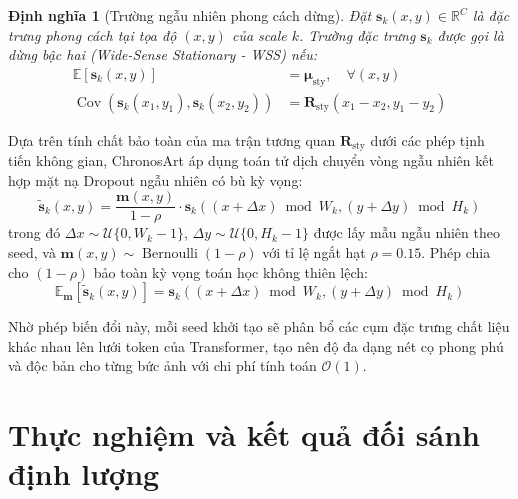 \documentclass[10pt,twocolumn,letterpaper]{article}
\newtheorem{definition}{Định nghĩa}
\begin{document}
\begin{definition}[Trường ngẫu nhiên phong cách dừng]
Đặt $\mathbf{s}_k(x, y) \in \mathbb{R}^C$ là đặc trưng phong cách tại tọa độ $(x, y)$ của scale $k$. Trường đặc trưng $\mathbf{s}_k$ được gọi là dừng bậc hai (Wide-Sense Stationary - WSS) nếu:
\begin{align}
\mathbb{E}[\mathbf{s}_k(x, y)] &= \boldsymbol{\mu}_{\text{sty}}, \quad \forall (x, y) \\
\operatorname{Cov}\left(\mathbf{s}_k(x_1, y_1), \mathbf{s}_k(x_2, y_2)\right) &= \mathbf{R}_{\text{sty}}(x_1 - x_2, y_1 - y_2)
\end{align}
\end{definition}

Dựa trên tính chất bảo toàn của ma trận tương quan $\mathbf{R}_{\text{sty}}$ dưới các phép tịnh tiến không gian, ChronosArt áp dụng toán tử dịch chuyển vòng ngẫu nhiên kết hợp mặt nạ Dropout ngẫu nhiên có bù kỳ vọng:
\begin{equation}
\widetilde{\mathbf{s}}_k(x, y) = \frac{\mathbf{m}(x, y)}{1 - \rho} \cdot \mathbf{s}_k\left((x + \Delta x) \bmod W_k, (y + \Delta y) \bmod H_k\right)
\end{equation}
trong đó $\Delta x \sim \mathcal{U}\{0, W_k - 1\}$, $\Delta y \sim \mathcal{U}\{0, H_k - 1\}$ được lấy mẫu ngẫu nhiên theo seed, và $\mathbf{m}(x, y) \sim \operatorname{Bernoulli}(1 - \rho)$ với tỉ lệ ngắt hạt $\rho = 0.15$. Phép chia cho $(1 - \rho)$ bảo toàn kỳ vọng toán học không thiên lệch:
\begin{equation}
\mathbb{E}_{\mathbf{m}}[\widetilde{\mathbf{s}}_k(x, y)] = \mathbf{s}_k\left((x + \Delta x) \bmod W_k, (y + \Delta y) \bmod H_k\right)
\end{equation}

Nhờ phép biến đổi này, mỗi seed khởi tạo sẽ phân bổ các cụm đặc trưng chất liệu khác nhau lên lưới token của Transformer, tạo nên độ đa dạng nét cọ phong phú và độc bản cho từng bức ảnh với chi phí tính toán $\mathcal{O}(1)$.

\section{Thực nghiệm và kết quả đối sánh định lượng}
\label{sec:experiments}
\end{document}
